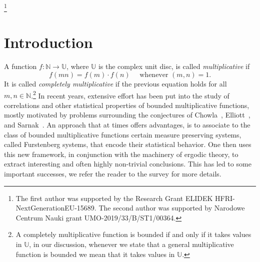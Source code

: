 \documentclass[11pt]{amsart}
\theoremstyle{definition}
\newcommand{\N}{{\mathbb N}}
\newcommand{\U}{{\mathbb U}}
\begin{document}
\thanks{The first author was supported  by the Research Grant ELIDEK HFRI-NextGenerationEU-15689.
	The second  author was  supported by Narodowe Centrum Nauki grant UMO-2019/33/B/ST1/00364.}



\date{\today}

\maketitle

 
\setcounter{tocdepth}{1}
\tableofcontents

	
	\section{Introduction}

A function $f\colon \N\to \U$, where $\U$ is the complex unit disc,  is called {\em multiplicative} if
$$
f(mn)=f(m)\cdot f(n)  \quad \text {  whenever  }  (m,n)=1.
$$
It is called {\em completely multiplicative} if the previous equation holds for all $m,n\in\N$.\footnote{A completely multiplicative function is bounded if and only if it takes values in $\U$, in our discussion, whenever we state  that a general multiplicative function is bounded we mean that it takes values in $\U$. }  In recent years,  extensive effort has been put into the study of correlations and other statistical properties of bounded multiplicative functions, mostly motivated by problems surrounding
 the  conjectures of Chowla~\cite{Ch65}, Elliott~\cite{El90,El94}, and Sarnak~\cite{S, Sa12}.
 An approach that at times  offers   advantages,  is to   associate to  the class of bounded multiplicative functions
certain   measure preserving systems, called Furstenberg systems,  that encode their   statistical behavior. One  then uses this new framework, in conjunction with  the machinery of ergodic theory, to extract interesting and often highly non-trivial conclusions.
 This has led to some important  successes, we refer the reader to the survey \cite{FKL17} for more details.

\end{document}

